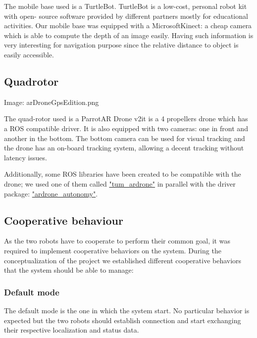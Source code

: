 \documentclass[11pt,a4paper]{article}
\newcommand{\centerImage}[1]{
\begin{center}
Image: #1
\end{center}
}
\begin{document}
The mobile base used is a TurtleBot. TurtleBot is a low-cost, personal robot kit with open-
source software
provided by different partners mostly for educational activities.
Our mobile base was equipped with a Microsoft\textcopyright Kinect\texttrademark : a cheap 
camera which is
able to compute the depth of an image easily. Having such information is very interesting for 
navigation
purpose since the relative distance to object is easily accessible.

\subsection{Quadrotor}
\centerImage{arDroneGpsEdition.png}

The quad-rotor used is a Parrot\textcopyright AR Drone v2\texttrademark it is a 4 propellers
drone which has a ROS compatible driver. It is also equipped with two cameras: one in front
and another in the bottom. The bottom camera can be used for visual tracking and the drone
has an on-board tracking system, allowing a decent tracking without latency issues.

Additionally, some ROS libraries have been created to be compatible with the drone; we used
one of them called \href{"http://wiki.ros.org/tum_ardrone"}{"tum\_ardrone"} in parallel with
the driver package: \href{"https://github.com/AutonomyLab/ardrone_autonomy"}
{"ardrone\_autonomy"}.

\subsection{Cooperative behaviour}
As the two robots have to cooperate to perform their common goal, it was required to implement
cooperative behaviors on the system. During the conceptualization of the project we established different
cooperative behaviors that the system should be able to manage:


\subsubsection{Default mode}
The default mode is the one in which the system start. No particular behavior is expected but the two
robots should establish connection and start exchanging their respective localization and status data.
\end{document}
